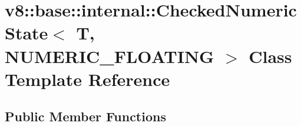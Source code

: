 \hypertarget{classv8_1_1base_1_1internal_1_1_checked_numeric_state_3_01_t_00_01_n_u_m_e_r_i_c___f_l_o_a_t_i_n_g_01_4}{}\section{v8\+:\+:base\+:\+:internal\+:\+:Checked\+Numeric\+State$<$ T, N\+U\+M\+E\+R\+I\+C\+\_\+\+F\+L\+O\+A\+T\+I\+NG $>$ Class Template Reference}
\label{classv8_1_1base_1_1internal_1_1_checked_numeric_state_3_01_t_00_01_n_u_m_e_r_i_c___f_l_o_a_t_i_n_g_01_4}
\subsection*{Public Member Functions}
